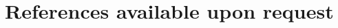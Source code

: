 \documentclass[10pt]{article}
\begin{document}

\section*{References available upon request}
\end{document}
